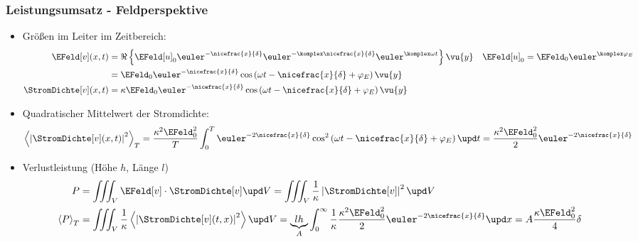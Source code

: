 \begin{frame}
   \frametitle{Leistungsumsatz - Feldperspektive}
\begin{itemize}[<+->]
\item Größen im Leiter im Zeitbereich:
  \begin{align*}
    \EFeld[v](x,t) &= \Re \left\{ \EFeld[u]_{0} \euler^{-\nicefrac{x}{\delta}} \euler^{-\komplex\nicefrac{x}{\delta}} \euler^{\komplex\omega t} \right\} \vu{y}   \quad \EFeld[u]_{0} = \EFeld_{0} \euler^{\komplex\varphi_E} \\
    &= \EFeld_0 \euler^{-\nicefrac{x}{\delta}} \cos\left(\omega t -\nicefrac{x}{\delta} +\varphi_E \right) \vu{y} \\
   \StromDichte[v](x,t) &= \kappa\EFeld_0 \euler^{-\nicefrac{x}{\delta}} \cos\left(\omega t -\nicefrac{x}{\delta} +\varphi_E \right) \vu{y} 
  \end{align*}
\item Quadratischer Mittelwert der Stromdichte:
  $$\left\langle \left| \StromDichte[v](x,t) \right|^2  \right\rangle_T  = \frac{\kappa^2\EFeld_0^2}{T} \int_0^T \euler^{-2\nicefrac{x}{\delta}} \cos^2\left(\omega t -\nicefrac{x}{\delta} +\varphi_E \right) \upd t = \frac{\kappa^2\EFeld_0^2}{2} \euler^{-2\nicefrac{x}{\delta}}
  $$
\item Verlustleistung (Höhe $h$, Länge $l$)
  \begin{align*}
    P &= \iiint_V \EFeld[v]\cdot\StromDichte[v]\upd V = \iiint_V \frac{1}{\kappa}\left|\StromDichte[v]\right|^2\upd V\\
    \left\langle P\right\rangle_T &=\iiint_V \frac{1}{\kappa}\left\langle\left|\StromDichte[v](t,x)\right|^2\right\rangle\upd V = \underbrace{l h}_{A}\int_0^\infty \frac{1}{\kappa}\frac{\kappa^2\EFeld_0^2}{2} \euler^{-2\nicefrac{x}{\delta}}\upd x = A  \frac{\kappa\EFeld_0^2}{4} \delta
    \end{align*}
 \end{itemize}
\end{frame}

